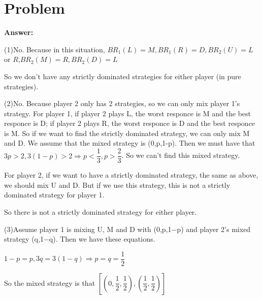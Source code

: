 \documentclass[a4 paper,12pt]{article}
\begin{document}
\section{Problem}
\noindent
\textbf{Answer:}
\par (1)No. Because in this situation, $BR_{1}(L)=M,BR_{1}(R)=D,BR_{2}(U)=L$ or $R$,$BR_{2}(M)=R,BR_{2}(D)=L$
\par So we don't have any strictly dominated strategies for either player (in
pure strategies).
\par (2)No. Because player 2 only has 2 strategies, so we can only mix player 1's strategy. For player 1, if player 2 plays L, the worst responce is M and the best responce is D; if player 2 plays R, the worst responce is D and the best responce is M. So if we want to find the strictly dominated strategy, we can only mix M and D. We assume that the mixed strategy is (0,p,1-p). Then we must have that $3p>2,3(1-p)>2\Rightarrow p<\dfrac{1}{3}, p>\dfrac{2}{3}$. So we can't find this mixed strategy.
\par For player 2, if we want to have a strictly dominated strategy, the same as above, we should mix U and D. But if we use this strategy, this is not a strictly dominated strategy for player 1.
\par So there is not a strictly dominated strategy for either player.  
\par (3)Assume player 1 is mixing U, M and D with (0,p,1−p) and player 2's mixed strategy (q,1−q). Then we have these equations.
\par   $1-p=p,3q=3(1-q)\Rightarrow p=q=\dfrac{1}{2}$
\par So the mixed strategy is that $[(0,\dfrac{1}{2},\dfrac{1}{2}),(\dfrac{1}{2},\dfrac{1}{2})]$
\end{document}
